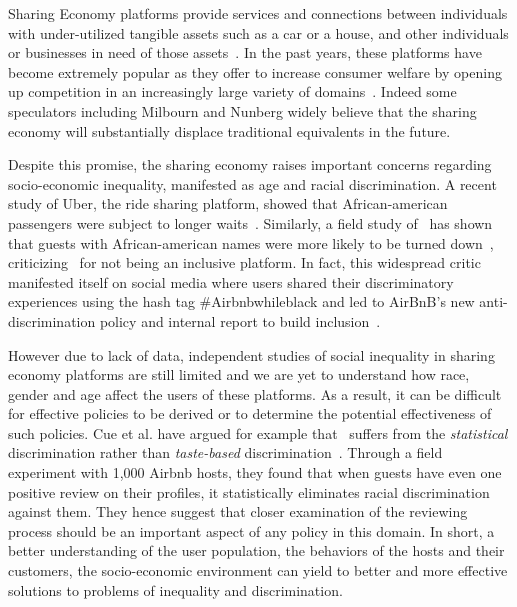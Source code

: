 Sharing Economy platforms provide services and connections between individuals with under-utilized tangible assets such as a car or a house, and other individuals or businesses in need of those assets~\cite{FRENKEN20173,sprague2015worker}. In the past years, these platforms have become extremely popular as they offer to increase consumer welfare by opening up competition in an increasingly large variety of domains~\cite{smith2016shared}. Indeed some speculators including Milbourn \cite{milbourn2015future} and Nunberg \cite{nunberg2016goodbye} widely believe that the sharing economy will substantially displace traditional equivalents in the future.

Despite this promise, the sharing economy raises important concerns regarding socio-economic inequality, manifested as age and racial discrimination. A recent study of Uber, the ride sharing platform, showed that African-american passengers were subject to longer waits~\cite{ge2016racial}. Similarly,  a field study of \ab  \ has shown that  guests with African-american names were more likely to be turned down~\cite{edelman2017racial}, criticizing \ab \ for not being an inclusive platform.  In fact, this widespread critic manifested itself on social media where users shared their discriminatory experiences using the hash tag \#Airbnbwhileblack and led to AirBnB's new anti-discrimination policy and internal report to build inclusion~\cite{murphy2016airbnb}. 

However due to lack of data, independent studies of social inequality in sharing economy platforms are still limited and we are yet to understand how race, gender and age affect the users of these platforms. As a result, it can be difficult for effective policies to be derived or to determine the potential effectiveness of such policies. Cue et al. have argued for example that \ab \ suffers from the \emph{statistical} discrimination rather than \emph{taste-based} discrimination~\cite{cui2016discrimination}. Through a field experiment with 1,000 Airbnb hosts, they found that when guests have even one positive review on their profiles, it statistically eliminates racial discrimination against them. They hence suggest that closer examination of the reviewing process should be an important aspect of any policy in this domain. In short, a better understanding of the user population, the behaviors of the hosts and their customers, the socio-economic environment can yield to better and more effective solutions to problems of inequality and discrimination.

